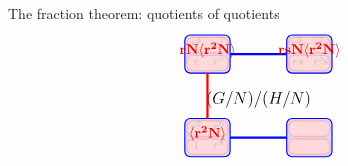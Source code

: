\documentclass[8pt, handout]{beamer}
\begin{document}
\begin{frame}{The fraction theorem: quotients of quotients}
  \[
  \begin{tikzpicture}[xscale=.95,scale=.6]
    \begin{scope}
      \node at (3.25,2.4) {\large $(G/N)/(H/N)$};
      \tikzstyle{every node}=[font=\footnotesize,anchor=south,faded]
      \begin{scope}[shift={(0,3.5)}]
        \draw[thick,xBlue,fill=cosetBlue,rounded corners] (0,0) rectangle (2,1.6);
        \draw[thick,fRed,rounded corners,fill=cosetRed] (.1,.1) rectangle (1.9,.75);
        \draw[thick,fRed,rounded corners,fill=cosetRed] (.1,.85) rectangle (1.9,1.5);
        \node at (.5,.9) {$r^3$};
        \node at (1.5,.9) {$r^7$};
        \node at (.5,.15) {$r$};
        \node at (1.5,.15) {$r^5$};
        \node[xRed] at (1,.45) {\normalsize $\mathbf{rN\<r^2N\>}$};
        \draw[ultra thick,eBlue] (2,.8)--(4.5,.8);
      \end{scope}
      \begin{scope}[shift={(0,0)}]
        \draw[thick,xBlue,fill=cosetBlue,rounded corners] (0,0) rectangle (2,1.6);
        \draw[thick,fRed,rounded corners,fill=cosetRed] (.1,.1) rectangle (1.9,.75);
        \draw[thick,fRed,rounded corners,fill=cosetRed] (.1,.85) rectangle (1.9,1.5);
        \node at (.5,.9) {$r^2$};
        \node at (1.5,.9) {$r^6$};
        \node at (.5,.15) {$1$};
        \node at (1.5,.15) {$r^4$};
        \node[xRed] at (1,.45) {\normalsize $\mathbf{\<r^2N\>}$};
        \draw[ultra thick,eBlue] (2,.8)--(4.5,.8);
        \draw[ultra thick,eRed] (1,1.6)--(1,3.5);
      \end{scope}
      \begin{scope}[shift={(4.5,3.5)}]
        \draw[thick,xBlue,fill=cosetBlue,rounded corners] (0,0) rectangle (2,1.6);
        \draw[thick,fRed,rounded corners,fill=cosetRed] (.1,.1) rectangle (1.9,.75);
        \draw[thick,fRed,rounded corners,fill=cosetRed] (.1,.85) rectangle (1.9,1.5);
        \node at (.5,.9) {$r^3\!s$};
        \node at (1.5,.9) {$r^7\!s$};
        \node at (.5,.15) {$rs$};
        \node at (1.5,.15) {$r^5\!s$};
        \node[xRed] at (1,.45) {\normalsize $\mathbf{rsN\<r^2N\>}$};
      \end{scope}
      \begin{scope}[shift={(4.5,0)}]
        \draw[thick,xBlue,fill=cosetBlue,rounded corners] (0,0) rectangle (2,1.6);
        \draw[thick,fRed,rounded corners,fill=cosetRed] (.1,.1) rectangle (1.9,.75);
        \draw[thick,fRed,rounded corners,fill=cosetRed] (.1,.85) rectangle (1.9,1.5);

\end{scope}
\end{scope}
\end{tikzpicture}\]
\end{frame}
\end{document}
